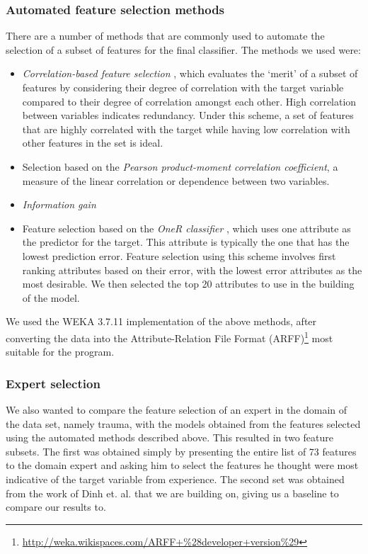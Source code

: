 \subsubsection{Automated feature selection methods}
There are a number of methods that are commonly used to automate the selection
of a subset of features for the final classifier. The methods we used were:
\begin{itemize}
  \item \textit{Correlation-based feature selection} \citep{Hall2000},
  which evaluates the `merit' of a
  subset of features by considering their degree of correlation with the target
  variable compared to their degree of correlation amongst each other. High
  correlation between variables indicates redundancy. Under
  this scheme, a set of features that are highly correlated with the target
  while having low correlation with other features in the set is ideal.
  \item Selection based on the
  \textit{Pearson product-moment correlation coefficient}, a measure of the
  linear correlation or dependence between two variables.
  \item \textit{Information gain} 
  \item Feature selection based on the \textit{OneR classifier}
  \citep{Holte1993}, which uses one
  attribute as the predictor for the target. This attribute is typically the one
  that has the lowest prediction error. Feature selection using this scheme
  involves first ranking attributes based on their error, with the lowest error
  attributes as the most desirable. We then selected the top 20 attributes to
  use in the building of the model.
\end{itemize}

We used the WEKA 3.7.11 \citep{Hall2009} implementation of the above
methods, after converting the data into the Attribute-Relation File Format
(ARFF)\footnote{\url{http://weka.wikispaces.com/ARFF+\%28developer+version\%29}}
most suitable for the program.

\subsubsection{Expert selection}
We also wanted to compare the feature selection of an expert in the domain
of the data set, namely trauma, with the models obtained from the features
selected using the automated methods described above. This resulted in two
feature subsets. The first was obtained simply by presenting the entire list
of 73 features to the domain expert and asking him to select the features he
thought were most indicative of the target variable from experience. The
second set was obtained from the work of Dinh et. al. \citep{Dinh2013a} that
we are building on, giving us a baseline to compare our results to.

